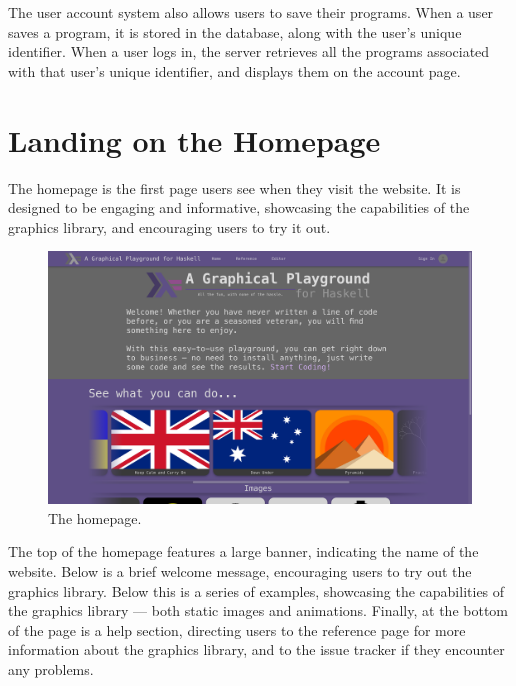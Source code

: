 \documentclass[../main.tex]{subfiles}
\begin{document}
        The user account system also allows users to save their programs.
        When a user saves a program, it is stored in the database, along with the
            user's unique identifier.
        When a user logs in, the server retrieves all the programs associated with that
            user's unique identifier, and displays them on the account page.

    \section{Landing on the Homepage}
        The homepage is the first page users see when they visit the website.
        It is designed to be engaging and informative, showcasing the capabilities of
            the graphics library, and encouraging users to try it out.

        \begin{figure}[H]
            \centering
            \includegraphics[width=0.75\linewidth]{images/homepage.png}
                \caption{The homepage.}
                \label{fig:homepage}
        \end{figure}

        The top of the homepage features a large banner, indicating the name of the
            website.
        Below is a brief welcome message, encouraging users to try out the graphics
            library.
        Below this is a series of examples, showcasing the capabilities of the graphics
            library — both static images and animations.
        Finally, at the bottom of the page is a help section, directing users to the
            reference page for more information about the graphics library, and to the
            issue tracker if they encounter any problems.
\end{document}
